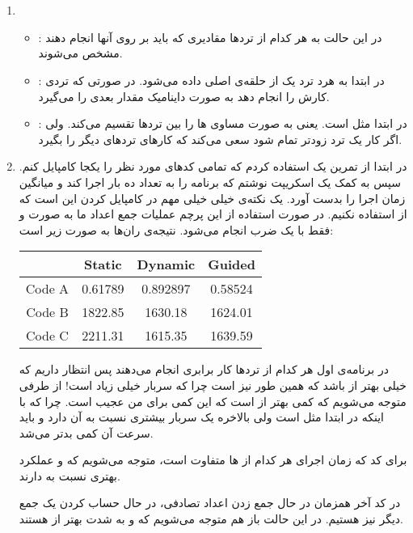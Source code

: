 \section{}
\begin{enumerate}
    \item \begin{itemize}
        \item {}: در این حالت به هر کدام از ترد‌ها مقادیری که باید بر روی آنها
        انجام دهند مشخص می‌شوند.
        \item {}: در ابتدا به هرد ترد یک 
        از حلقه‌ی اصلی داده می‌شود. در صورتی که تردی کارش را انجام دهد به صورت داینامیک مقدار بعدی
        را می‌گیرد.
        \item {}: در ابتدا مثل  است.
        یعنی به صورت مساوی
        ها
        را بین ترد‌ها تقسیم می‌کند. ولی اگر کار یک ترد زودتر تمام شود سعی می‌کند که کار‌های ترد‌های دیگر را بگیرد.
    \end{itemize}
    \item در ابتدا از  تمرین یک استفاده کردم که تمامی کد‌های مورد نظر را یکجا کامپایل کنم.
    سپس به کمک
    یک اسکریپت نوشتم که برنامه را به تعداد ده بار اجرا کند و میانگین زمان اجرا را بدست آورد. یک نکته‌ی خیلی خیلی مهم در کامپایل کردن این است که از
    استفاده نکنیم. در صورت استفاده از این پرچم عملیات جمع اعداد ما به صورت
    و فقط با یک ضرب انجام می‌شود. نتیجه‌ی ران‌ها به صورت
    زیر است:
    \begin{latin}
        \centering
        \begin{tabular}{|c|c|c|c|}
            \hline
            & Static & Dynamic & Guided\\
            \hline
            Code A & 0.61789 & 0.892897 & 0.58524 \\
            \hline
            Code B & 1822.85 & 1630.18 & 1624.01 \\
            \hline
            Code C & 2211.31 & 1615.35 & 1639.59 \\
            \hline
        \end{tabular}
    \end{latin}
    در برنامه‌ی اول هر کدام از ترد‌ها کار برابری انجام می‌دهند پس انتظار داریم که
    خیلی بهتر از
    باشد که همین طور نیز است چرا که سربار
    خیلی زیاد است!
    از طرفی متوجه می‌شویم که
    کمی بهتر از
    است که این کمی برای من عجیب است. چرا که با اینکه در ابتدا
    مثل
    است ولی بالاخره یک سربار بیشتری نسبت به آن دارد و باید سرعت آن کمی بدتر می‌شد.

    برای کد
    که زمان اجرای هر کدام از
    ها
    متفاوت است، متوجه می‌شویم که
     و 
    عملکرد بهتری نسبت به
    دارند.

    در کد آخر همزمان در حال جمع زدن اعداد تصادفی، در حال حساب کردن یک جمع دیگر نیز هستیم. در این حالت
    باز هم متوجه می‌شویم که
     و 
    به شدت بهتر از
    هستند.
\end{enumerate}
